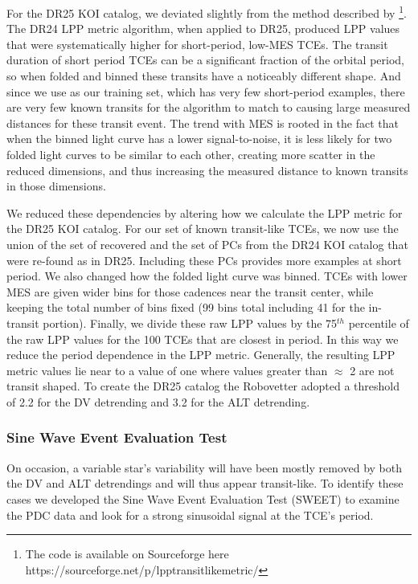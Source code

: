 For the DR25 KOI catalog, we deviated slightly from the method described by \citet{Thompson2015b}\footnote{The code is available on Sourceforge here https://sourceforge.net/p/lpptransitlikemetric/}.  The DR24 LPP metric algorithm, when applied to DR25, produced LPP values that were systematically higher for short-period, low-MES TCEs. The transit duration of short period TCEs can be a significant fraction of the orbital period, so when folded and binned these transits have a noticeably different shape. And since we use  as our training set, which has very few short-period examples, there are very few known transits for the algorithm to match to causing large measured distances for these transit event. The trend with MES is rooted in the fact that when the binned light curve has a lower signal-to-noise, it is less likely for two folded light curves to be similar to each other, creating more scatter in the reduced dimensions, and thus increasing the measured distance to known transits in those dimensions.  

We reduced these dependencies by altering how we calculate the LPP metric for the DR25 KOI catalog. For our set of known transit-like TCEs, we now use the union of the set of recovered  and the set of PCs from the DR24 KOI catalog \citep{Coughlin2016} that were re-found as  in DR25. Including these PCs provides more examples at short period. We also changed how the folded light curve was binned. TCEs with lower MES are given wider bins for those cadences near the transit center, while keeping the total number of bins fixed (99 bins total including 41 for the in-transit portion). Finally, we divide these raw LPP values by the 75$^{th}$ percentile of the raw LPP values for the 100 TCEs that are closest in period.  In this way we reduce the period dependence in the LPP metric.  Generally, the resulting LPP metric values lie near to a value of one where values greater than $\approx$ 2 are not transit shaped.  To create the DR25 catalog the Robovetter adopted a threshold of 2.2 for the DV detrending and 3.2 for the ALT detrending.





\subsubsection{Sine Wave Event Evaluation Test}
\label{s:sweetntl}

On occasion, a variable star's variability will have been mostly removed by both the DV and ALT detrendings and will thus appear transit-like. To identify these cases we developed the Sine Wave Event Evaluation Test (SWEET) to examine the PDC data and look for a strong sinusoidal signal at the TCE's period. 

